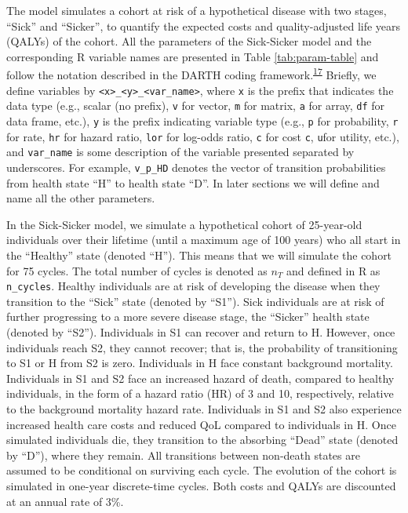 \documentclass[
]{article}
\begin{document}
The model simulates a cohort at risk of a hypothetical disease with two stages, ``Sick'' and ``Sicker'', to quantify the expected costs and quality-adjusted life years (QALYs) of the cohort.
All the parameters of the Sick-Sicker model and the corresponding R variable names are presented in Table \ref{tab:param-table} and follow the notation described in the DARTH coding framework.\textsuperscript{\protect\hyperlink{ref-Alarid-Escudero2019e}{17}} Briefly, we define variables by \texttt{\textless{}x\textgreater{}\_\textless{}y\textgreater{}\_\textless{}var\_name\textgreater{}}, where \texttt{x} is the prefix that indicates the data type (e.g., scalar (no prefix), \texttt{v} for vector, \texttt{m} for matrix, \texttt{a} for array, \texttt{df} for data frame, etc.), \texttt{y} is the prefix indicating variable type (e.g., \texttt{p} for probability, \texttt{r} for rate, \texttt{hr} for hazard ratio, \texttt{lor} for log-odds ratio, \texttt{c} for cost \texttt{c}, \texttt{u}for utility, etc.), and \texttt{var\_name} is some description of the variable presented separated by underscores. For example, \texttt{v\_p\_HD} denotes the vector of transition probabilities from health state ``H'' to health state ``D''. In later sections we will define and name all the other parameters.

In the Sick-Sicker model, we simulate a hypothetical cohort of 25-year-old individuals over their lifetime (until a maximum age of 100 years) who all start in the ``Healthy'' state (denoted ``H''). This means that we will simulate the cohort for 75 cycles. The total number of cycles is denoted as \(n_T\) and defined in R as \texttt{n\_cycles}. Healthy individuals are at risk of developing the disease when they transition to the ``Sick'' state (denoted by ``S1''). Sick individuals are at risk of further progressing to a more severe disease stage, the ``Sicker'' health state (denoted by ``S2''). Individuals in S1 can recover and return to H. However, once individuals reach S2, they cannot recover; that is, the probability of transitioning to S1 or H from S2 is zero. Individuals in H face constant background mortality. Individuals in S1 and S2 face an increased hazard of death, compared to healthy individuals, in the form of a hazard ratio (HR) of 3 and 10, respectively, relative to the background mortality hazard rate. Individuals in S1 and S2 also experience increased health care costs and reduced QoL compared to individuals in H. Once simulated individuals die, they transition to the absorbing ``Dead'' state (denoted by ``D''), where they remain. All transitions between non-death states are assumed to be conditional on surviving each cycle. The evolution of the cohort is simulated in one-year discrete-time cycles. Both costs and QALYs are discounted at an annual rate of 3\%.
\end{document}

